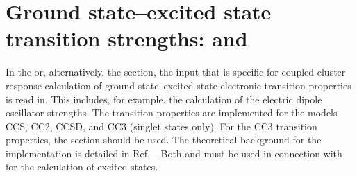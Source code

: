 
\section{Ground state--excited state transition strengths: 
 and }
\label{sec:cclrsd}


In the  or, alternatively, the  section, the input that is
specific for coupled cluster response calculation of ground state--excited state
electronic transition properties is read in.
This includes, for example, the calculation of the electric dipole
oscillator strengths.
The transition properties are implemented for the models CCS, CC2, CCSD, and CC3
(singlet states only). For the CC3 transition properties, the 
section should be used.
The theoretical background for the implementation 
is detailed in Ref.\ \cite{Christiansen:CCLR,Christiansen:QEL}.
Both  and  must be used in connection with  
for the calculation of excited states.

\begin{center}
\end{center}

